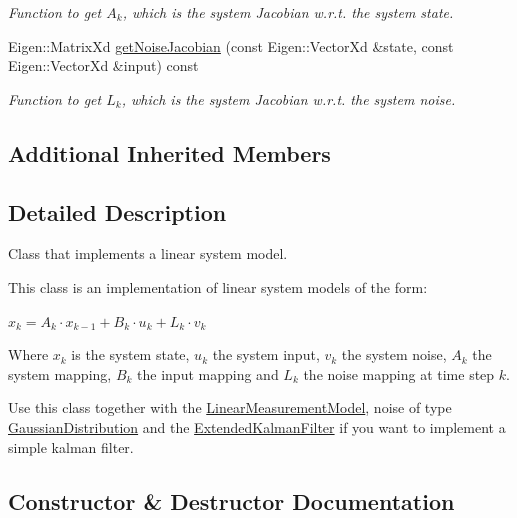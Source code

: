 \begin{DoxyCompactItemize}
\begin{DoxyCompactList}\small\item\em Function to get $ A_k $, which is the system Jacobian w.\+r.\+t. the system state. \end{DoxyCompactList}\item 
Eigen\+::\+Matrix\+Xd \hyperlink{classrefill_1_1LinearSystemModel_ab6f766c6412db70c7fcb6676d68c1461}{get\+Noise\+Jacobian} (const Eigen\+::\+Vector\+Xd \&state, const Eigen\+::\+Vector\+Xd \&input) const 
\begin{DoxyCompactList}\small\item\em Function to get $ L_k $, which is the system Jacobian w.\+r.\+t. the system noise. \end{DoxyCompactList}\end{DoxyCompactItemize}
\subsection*{Additional Inherited Members}


\subsection{Detailed Description}
Class that implements a linear system model. 

This class is an implementation of linear system models of the form\+:

$ x_k = A_k \cdot x_{k-1} + B_k \cdot u_k + L_k \cdot v_k $

Where $ x_k $ is the system state, $ u_k $ the system input, $ v_k $ the system noise, $ A_k $ the system mapping, $ B_k $ the input mapping and $ L_k $ the noise mapping at time step $ k $.

Use this class together with the \hyperlink{classrefill_1_1LinearMeasurementModel}{Linear\+Measurement\+Model}, noise of type \hyperlink{classrefill_1_1GaussianDistribution}{Gaussian\+Distribution} and the \hyperlink{classrefill_1_1ExtendedKalmanFilter}{Extended\+Kalman\+Filter} if you want to implement a simple kalman filter. 

\subsection{Constructor \& Destructor Documentation}

